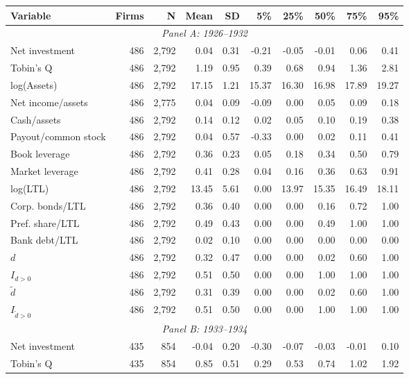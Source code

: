 \begin{threeparttable}
\begin{tabular}{lrrrrrrrrr}
\toprule
Variable & Firms & N & Mean & SD & 5\% & 25\% & 50\% & 75\% & 95\% \\
\midrule
\multicolumn{10}{c}{\textit{Panel A: 1926--1932}} \\
\midrule
Net investment & 486 & 2,792 & 0.04 & 0.31 & -0.21 & -0.05 & -0.01 & 0.06 & 0.41 \\
Tobin's Q & 486 & 2,792 & 1.19 & 0.95 & 0.39 & 0.68 & 0.94 & 1.36 & 2.81 \\
log(Assets) & 486 & 2,792 & 17.15 & 1.21 & 15.37 & 16.30 & 16.98 & 17.89 & 19.27 \\
Net income/assets & 486 & 2,775 & 0.04 & 0.09 & -0.09 & 0.00 & 0.05 & 0.09 & 0.18 \\
Cash/assets & 486 & 2,792 & 0.14 & 0.12 & 0.02 & 0.05 & 0.10 & 0.19 & 0.38 \\
Payout/common stock & 486 & 2,792 & 0.04 & 0.57 & -0.33 & 0.00 & 0.02 & 0.11 & 0.41 \\
Book leverage & 486 & 2,792 & 0.36 & 0.23 & 0.05 & 0.18 & 0.34 & 0.50 & 0.79 \\
Market leverage & 486 & 2,792 & 0.41 & 0.28 & 0.04 & 0.16 & 0.36 & 0.63 & 0.91 \\
log(LTL) & 486 & 2,792 & 13.45 & 5.61 & 0.00 & 13.97 & 15.35 & 16.49 & 18.11 \\
Corp. bonds/LTL & 486 & 2,792 & 0.36 & 0.40 & 0.00 & 0.00 & 0.16 & 0.72 & 1.00 \\
Pref. share/LTL & 486 & 2,792 & 0.49 & 0.43 & 0.00 & 0.00 & 0.49 & 1.00 & 1.00 \\
Bank debt/LTL & 486 & 2,792 & 0.02 & 0.10 & 0.00 & 0.00 & 0.00 & 0.00 & 0.00 \\
\ensuremath{d} & 486 & 2,792 & 0.32 & 0.47 & 0.00 & 0.00 & 0.02 & 0.60 & 1.00 \\
\ensuremath{I_{d>0}} & 486 & 2,792 & 0.51 & 0.50 & 0.00 & 0.00 & 1.00 & 1.00 & 1.00 \\
\ensuremath{\tilde{d}} & 486 & 2,792 & 0.31 & 0.39 & 0.00 & 0.00 & 0.02 & 0.60 & 1.00 \\
\ensuremath{I_{\tilde{d}>0}} & 486 & 2,792 & 0.51 & 0.50 & 0.00 & 0.00 & 1.00 & 1.00 & 1.00 \\
\midrule
\multicolumn{10}{c}{\textit{Panel B: 1933--1934}} \\
\midrule
Net investment & 435 & 854 & -0.04 & 0.20 & -0.30 & -0.07 & -0.03 & -0.01 & 0.10 \\
Tobin's Q & 435 & 854 & 0.85 & 0.51 & 0.29 & 0.53 & 0.74 & 1.02 & 1.92 \\

\end{tabular}
\end{threeparttable}
